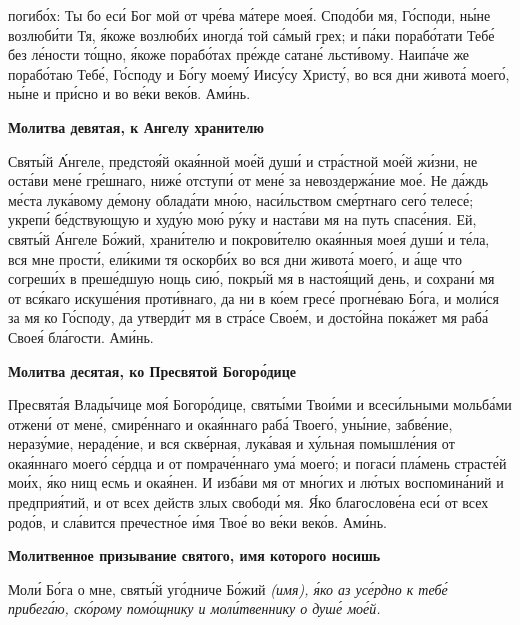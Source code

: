 погибо́х: Ты бо еси́ Бог мой от чре́ва ма́тере моея́. Сподо́би мя, Го́споди,
ны́не возлюби́ти Тя, я́коже возлюби́х иногда́ той са́мый грех; и па́ки
порабо́тати Тебе́ без ле́ности то́щно, я́коже порабо́тах пре́жде сатане́
льсти́вому. Наипа́че же порабо́таю Тебе́, Го́споду и Бо́гу моему́ Иису́су
Христу́, во вся дни живота́ моего́, ны́не и при́сно и во ве́ки веко́в.
Ами́нь.



 

\bfseries Молитва девятая, к Ангелу хранителю\normalfont{}


   Святы́й А́нгеле, предстоя́й окая́нной мое́й души́ и стра́стной мое́й жи́зни,
не оста́ви мене́ гре́шнаго, ниже́ отступи́ от мене́ за невоздержа́ние мое́. Не
да́ждь ме́ста лука́вому де́мону облада́ти мно́ю, наси́льством сме́ртнаго сего́
телесе́; укрепи́ бе́дствующую и худу́ю мою́ ру́ку и наста́ви мя на путь
спасе́ния. Ей, святы́й А́нгеле Бо́жий, храни́телю и покрови́телю окая́нныя
моея́ души́ и те́ла, вся мне прости́, ели́кими тя оскорби́х во вся дни живота́
моего́, и а́ще что согреши́х в преше́дшую нощь сию́, покры́й мя в
настоя́щий день, и сохрани́ мя от вся́каго искуше́ния проти́внаго,
да ни в ко́ем гресе́ прогне́ваю Бо́га, и моли́ся за мя ко Го́споду, да
утверди́т мя в стра́се Свое́м, и досто́йна пока́жет мя раба́ Своея́ бла́гости.
Ами́нь.



 

\bfseries Молитва десятая, ко Пресвятой Богоро́дице\normalfont{}


   Пресвята́я Влады́чице моя́ Богоро́дице, святы́ми Твои́ми и всеси́льными
мольба́ми отжени́ от мене́, смире́ннаго и окая́ннаго раба́ Твоего́, уны́ние,
забве́ние, неразу́мие, нераде́ние, и вся скве́рная, лука́вая и ху́льная
помышле́ния от окая́ннаго моего́ се́рдца и от помраче́ннаго ума́ моего́; и
погаси́ пла́мень страсте́й мои́х, я́ко нищ есмь и окая́нен. И изба́ви мя от
мно́гих и лю́тых воспомина́ний и предприя́тий, и от всех действ злых свободи́
мя. Я́ко благослове́на еси́ от всех родо́в, и сла́вится пречестно́е и́мя Твое́ во
ве́ки веко́в. Ами́нь.



 

\bfseries Молитвенное призывание святого, имя которого носишь\normalfont{}


   Моли́ Бо́га о мне, святы́й уго́дниче Бо́жий \itshape (имя)\normalfont{}, я́ко аз усе́рдно к тебе́
прибега́ю, ско́рому помо́щнику и моли́твеннику о душе́ мое́й.



